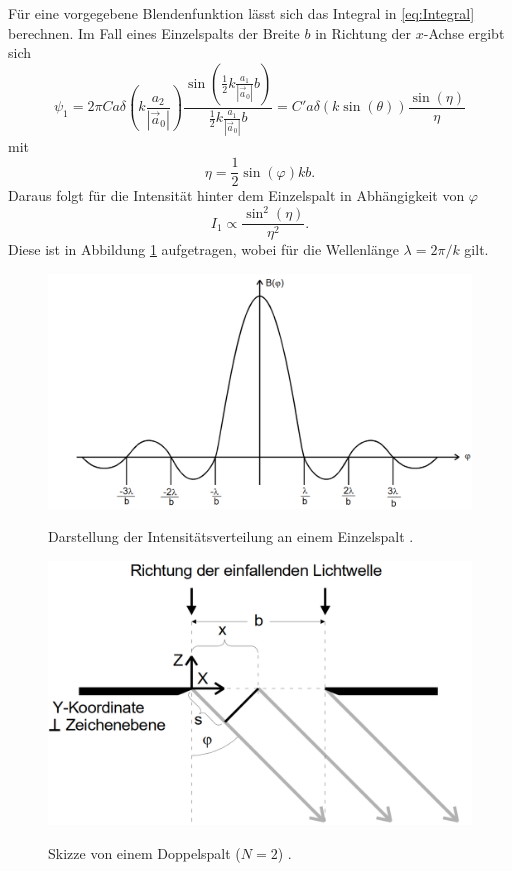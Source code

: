 Für eine vorgegebene Blendenfunktion lässt sich das Integral in \eqref{eq:Integral} berechnen. Im Fall eines Einzelspalts der Breite $b$ in Richtung der $x$-Achse ergibt sich
\begin{equation}
	\psi_1 = 2 \pi C a \delta\left(k \frac{a_2}{|\vec{a}_0|}\right) \frac{\sin\left(\frac{1}{2} k \frac{a_1}{|\vec{a}_0|} b\right)}{\frac{1}{2} k \frac{a_1}{|\vec{a}_0|} b} = C' a \delta(k \sin(\theta)) \frac{\sin(\eta)}{\eta}
\end{equation} 
mit 
\begin{equation}
	\eta = \frac{1}{2} \sin(\varphi) k b .
\end{equation}
Daraus folgt für die Intensität hinter dem Einzelspalt in Abhängigkeit von $\varphi$
\begin{equation}
	I_1 \propto \frac{\sin^2(\eta)}{\eta^2}\text{.}
\end{equation}
Diese ist in Abbildung \ref{fig:Int} aufgetragen, wobei für die Wellenlänge $\lambda=2\pi/k$ gilt.
\begin{figure}
	\centering
	\caption{Darstellung der Intensitätsverteilung an einem Einzelspalt \cite{V406}.}
	\includegraphics[width=\linewidth-70pt,height=\textheight-70pt,keepaspectratio]{content/images/Int.png}
	\label{fig:Int}
\end{figure}
\begin{figure}
	\centering
	\caption{Skizze von einem Doppelspalt ($N=2$) \cite{V406}.}
	\includegraphics[width=\linewidth-150pt,height=\textheight-150pt,keepaspectratio]{content/images/Einzelspalt.png}
	\label{fig:Doppel}
\end{figure}

